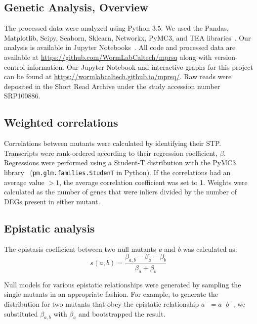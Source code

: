 \documentclass[9pt,twocolumn,twoside]{pnas-new}
\newcommand{\gene}[1]{\mbox{\emph{#1}}}
\begin{document}
{\subsection*{Genetic Analysis, Overview}
The processed data were analyzed using Python 3.5. We used the Pandas,
Matplotlib, Scipy, Seaborn, Sklearn, Networkx, PyMC3, and TEA
libraries~\cite{McKinney2011,Oliphant2007,
Pedregosa2012,Salvatier2015,VanDerWalt2011,Hunter2007,Angeles-Albores2016,Waskom}.
Our analysis is available in Jupyter Notebooks~\cite{Perez2007}. All code and
processed data are available at
\url{https://github.com/WormLabCaltech/mprsq} along with version-control
information. Our Jupyter Notebook and interactive graphs for this project can be
found at \url{https://wormlabcaltech.github.io/mprsq/}. Raw reads were deposited
in the Short Read Archive under the study accession number SRP100886.

\subsection*{Weighted correlations}
Correlations between mutants were calculated by identifying their
STP. Transcripts were rank-ordered according to their regression coefficient,
$\beta$. Regressions were performed using a Student-T
distribution with the PyMC3 library~\cite{Salvatier2015}
(\texttt{pm.glm.families.StudenT} in Python). If the correlations had an average
value $>1$, the average correlation coefficient was set to 1.
Weights were calculated as the number of genes that were inliers divided by the
number of DEGs present in either mutant.

\subsection*{Epistatic analysis}
The epistasis coefficient between two null mutants \gene{a} and \gene{b} was
calculated as:
\begin{equation}
  s(a, b) = \frac{\beta_{a,b} - \beta_a - \beta_b}{\beta_a + \beta_b}
\label{eq:epistasis_coef}
\end{equation}

Null models for various epistatic relationships were generated by sampling the
single mutants in an appropriate fashion. For example, to generate the
distribution for two mutants that obey the epistatic relationship $a^- =
a^-b^-$, we substituted $\beta_{a, b}$ with $\beta_a$ and bootstrapped the
result.

}
\end{document}
